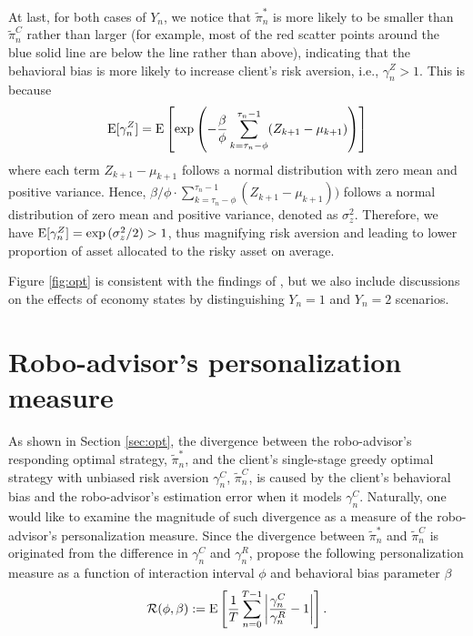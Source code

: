 At last, for both cases of $Y_n$, we notice that $\tilde\pi_n^*$ is more likely to be smaller than $\tilde \pi_n^C$ rather than larger (for example, most of the red scatter points around the blue solid line are below the line rather than above), indicating that the behavioral bias is more likely to increase client's risk aversion, i.e., $\gamma_n^Z>1$. This is because $$\mathrm{E}[\gamma_n^Z]=\mathrm{E}\left[\exp\left(-\frac{\beta}{\phi}\sum_{k=\tau_n-\phi}^{\tau_n-1}(Z_{k+1}-\mu_{k+1})\right)\right]$$ where each term $Z_{k+1}-\mu_{k+1}$ follows a normal distribution with zero mean and positive variance. Hence, ${\beta}/{\phi}\cdot \sum_{k=\tau_n-\phi}^{\tau_n-1}(Z_{k+1}-\mu_{k+1}))$ follows a normal distribution of zero mean and positive variance, denoted as $\sigma_z^2$. Therefore, we have $\mathrm{E}[\gamma_n^Z]=\exp{(\sigma_z^2/2)}>1$, thus magnifying risk aversion and leading to lower proportion of asset allocated to the risky asset on average.

Figure \ref{fig:opt} is consistent with the findings of , but we also include discussions on the effects of economy states by distinguishing $Y_n=1$ and $Y_n=2$ scenarios.

\section{Robo-advisor's personalization measure}\label{sec:personalize}
As shown in Section \ref{sec:opt}, the divergence between the robo-advisor's responding optimal strategy, $\tilde\pi_n^*$, and the client's single-stage greedy optimal strategy with unbiased risk aversion $\gamma_n^C$, $\tilde\pi_n^C$, is caused by the client's behavioral bias and the robo-advisor's estimation error when it models $\gamma_n^C$. Naturally, one would like to examine the magnitude of such divergence as a measure of the robo-advisor's personalization measure. Since the divergence between $\tilde\pi_n^*$ and $\tilde\pi_n^C$ is originated from the difference in $\gamma_n^C$ and $\gamma_n^R$,  propose the following personalization measure as a function of interaction interval $\phi$ and behavioral bias parameter $\beta$\begin{equation}
    \mathcal R(\phi,\beta):=\mathrm{E}\left[\frac1T\sum_{n=0}^{T-1}\left|\frac{\gamma_n^C}{\gamma_n^R}-1\right|\right].
\end{equation}

